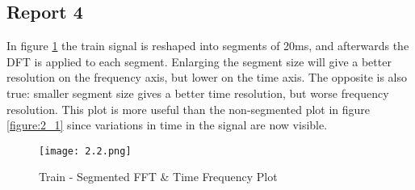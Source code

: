 \subsection*{Report 4}

In figure \ref{figure:2_2} the train signal is reshaped into segments of 20ms, and afterwards the DFT is applied to each segment. Enlarging the segment size will give a better resolution on the frequency axis, but lower on the time axis. The opposite is also true: smaller segment size gives a better time resolution, but worse frequency resolution. This plot is more useful than the non-segmented plot in figure \ref{figure:2_1} since variations in time in the signal are now visible.
	\begin{figure}[H] 
		\centering
		\texttt{[image: 2.2.png]}
		\caption{Train - Segmented FFT \& Time Frequency Plot}
		\label{figure:2_2}
	\end{figure}
	
	